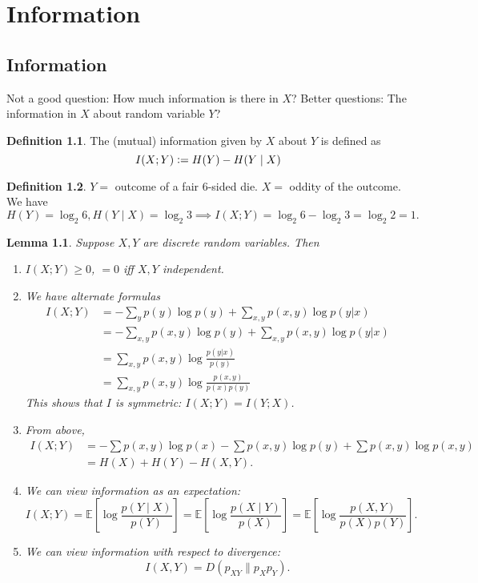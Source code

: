 \documentclass{report}
\newcommand{\defeq}{\vcentcolon=}
\newtheorem{lemma}{Lemma}[section]
\theoremstyle{definition}
\newtheorem{definition}{Definition}[section]
\theoremstyle{remark}
\numberwithin{equation}{section}
\begin{document}
\chapter{Information}

\section{Information}
Not a good question: How much information is there in $X$?
Better questions: The information in $X$ about random variable $Y$?

\begin{definition}
  The (mutual) information given by $X$ about $Y$ is defined as
  \[I(X; Y) \defeq H(Y) - H(Y \mid X)\]
\end{definition}
\begin{definition}
  $Y =$ outcome of a fair $6$-sided die. $X = $ oddity of the outcome. We have \[
  H(Y) = \log_2 6, H(Y \mid X) = \log_2 3 \implies I(X; Y) = \log_2 6 - \log_2 3 = \log_2 2 = 1.  
  \]
\end{definition}

\begin{lemma}
  Suppose $X, Y$ are discrete random variables. Then
  \begin{enumerate}
    \item $I(X; Y) \geq 0$, $= 0$ iff $X, Y$ independent.
    \item We have alternate formulas \begin{align*}
      I(X; Y) & = - \sum_{y} p(y) \log p(y) + \sum_{x, y} p(x, y) \log p(y|x) \\
      & = - \sum_{x, y} p(x, y) \log p(y) + \sum_{x, y} p(x, y) \log p(y|x) \\
      & = \sum_{x, y} p(x, y) \log \frac{p(y | x)}{p(y)} \\
      & = \sum_{x, y} p(x, y) \log \frac{p(x, y)}{p(x)p(y)} 
    \end{align*}
    This shows that $I$ is symmetric: $I(X; Y) = I(Y; X)$.
  
    \item From above, \begin{align*}
      I(X; Y) & = -\sum p(x, y)\log p(x) - \sum p(x, y)\log p(y) + \sum p(x, y)\log p(x, y) \\
      & = H(X) + H(Y) - H(X, Y).
    \end{align*}
  
    \item We can view information as an expectation: \[I(X; Y) = \mathbb{E}\left[\log \frac{p(Y \mid X)}{p(Y)}\right] = \mathbb{E}\left[\log \frac{p(X \mid Y)}{p(X)}\right] = \mathbb{E}\left[\log \frac{p(X, Y)}{p(X)p(Y)}\right].\]
    \item We can view information with respect to divergence: \[I(X, Y) = D(p_{XY} \| p_Xp_Y).\]
  \end{enumerate}
\end{lemma}
\end{document}
